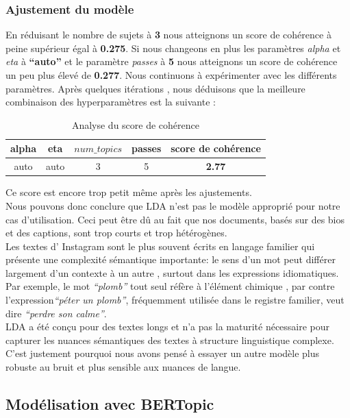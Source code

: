 \documentclass[12pt]{extarticle}
\begin{document}
\subsubsection{Ajustement du modèle}
En réduisant le nombre de sujets à \textbf{3}  nous atteignons  un score de cohérence à peine  supérieur égal à\textbf{ 0.275}. Si nous changeons en plus  les paramètres \textit{alpha} et \textit{eta}  à \textbf{“auto”} et le paramètre \textit{passes} à \textbf{5} nous  atteignons  un score de cohérence un peu plus élevé  de \textbf{0.277}.
Nous continuons à expérimenter avec les différents paramètres. Après quelques itérations , nous déduisons que la meilleure combinaison des hyperparamètres est la suivante :

\begin{table}[htbp]
    \centering
    \begin{tabular}{|c|c|c|c|c|}
     \hline
        alpha & eta & $num\_topics$ & passes &\textbf{score de cohérence} \\ \hline
         auto& auto & 3 & 5 & \textbf{2.77}\\
        \hline
    \end{tabular}
    \caption{Analyse du score de cohérence}
    \label{tab:coherence-score}
\end{table}
Ce score est encore trop petit même après les ajustements. \\
Nous pouvons  donc conclure que LDA n’est pas le modèle approprié pour notre cas d’utilisation. Ceci peut être dû au fait que nos documents, basés sur des bios et des captions, sont trop courts et trop hétérogènes.\\
Les textes d’ Instagram sont le plus souvent écrits en langage familier qui présente une complexité sémantique importante: le sens d’un mot peut différer largement d’un contexte à un autre , surtout dans les expressions idiomatiques. \\
Par exemple,  le mot \textit{“plomb”} tout seul réfère à l'élément chimique ,  par contre l’expression\textit{“péter un plomb”}, fréquemment utilisée dans le registre familier,  veut dire  \textit{“perdre son calme”}.\\
LDA a été conçu pour des textes longs et n’a pas la maturité nécessaire pour capturer les nuances sémantiques des textes à structure linguistique complexe.
C’est justement pourquoi nous avons pensé à essayer un autre modèle  plus robuste au bruit et plus sensible aux nuances de langue.
\subsection{Modélisation avec BERTopic}
\end{document}
